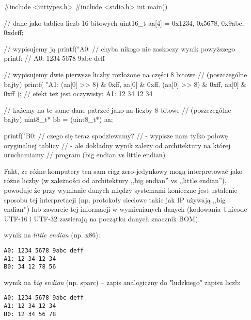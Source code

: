 \begin{CodeFrame*}[c]{}
#include <inttypes.h>
#include <stdio.h>
int main() {
    // dane jako tablica liczb 16 bitowych
    uint16_t aa[4] = {0x1234, 0x5678, 0x9abc, 0xdeff};
    
    // wypisujemy ją
    printf("A0: %
    // chyba nikogo nie zaskoczy wynik powyższego printf:
    //   A0: 1234 5678 9abc deff
    
    // wypisujemy dwie pierwsze liczby rozłożone na części 8 bitowe
    // (poszczególne bajty)
    printf(
        "A1: %
        (aa[0] >> 8) & 0xff, aa[0] & 0xff,
        (aa[0] >> 8) & 0xff, aa[0] & 0xff
    );
    // efekt też jest oczywisty:  A1: 12 34 12 34
    
    // każemy na te same dane patrzeć jako na liczby 8 bitowe
    // (poszczególne bajty)
    uint8_t* bb = (uint8_t*) aa;
    
    printf("B0: %
    // czego się teraz spodziewamy?
    //  - wypisze nam tylko połowę oryginalnej tablicy
    //  - ale dokładny wynik zależy od architektury na której uruchamiamy
    //    program (big endian vs little endian)
}
\end{CodeFrame*}

Fakt, że różne komputery ten sam ciąg zero-jedynkowy mogą interpretować jako różne liczby (w zależności od architektury ,,big endian'' vs ,,little endian''), powoduje że przy wymianie danych między systemami konieczne jest ustalenie sposobu tej interpretacji (np. protokoły sieciowe takie jak IP używają ,,big endian'') lub zawarcie tej informacji w wymienianych danych (kodowania Unicode UTF-16 i UTF-32 zawierają na początku danych znacznik BOM).

\begin{teacherOnly}
\begin{minipage}[t]{0.38\textwidth}
wynik na \emph{little endian} (np. x86):
\begin{Verbatim}
A0: 1234 5678 9abc deff
A1: 12 34 12 34
B0: 34 12 78 56
\end{Verbatim}
\end{minipage}
\hfill
\begin{minipage}[t]{0.58\textwidth}
wynik na \emph{big endian} (np. sparc) – zapis analogiczny do "ludzkiego" zapisu liczb:
\begin{Verbatim}
A0: 1234 5678 9abc deff
A1: 12 34 12 34
B0: 12 34 56 78
\end{Verbatim}
\end{minipage}
\end{teacherOnly}
